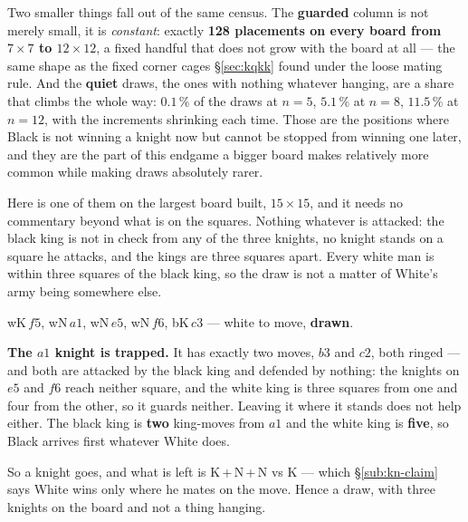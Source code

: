 \documentclass[11pt]{article}
\begin{document}
\smallskip
\noindent
Two smaller things fall out of the same census. The \textbf{guarded} column is
not merely small, it is \emph{constant}: exactly \textbf{128 placements on
every board from $7\times7$ to $12\times12$}, a fixed handful that does not
grow with the board at all --- the same shape as the fixed corner cages \S\ref{sec:kqkk}
found under the loose mating rule. And the \textbf{quiet} draws, the ones with
nothing whatever hanging, are a share that climbs the whole way: $0.1\,\%$ of
the draws at $n=5$, $5.1\,\%$ at $n=8$, $11.5\,\%$ at $n=12$, with the
increments shrinking each time. Those are the positions where Black is not
winning a knight now but cannot be stopped from winning one later, and they are
the part of this endgame a bigger board makes relatively more common while
making draws absolutely rarer.

\noindent
Here is one of them on the largest board built, $15\times15$, and it needs no
commentary beyond what is on the squares. Nothing whatever is attacked: the
black king is not in check from any of the three knights, no knight stands on a
square he attacks, and the kings are three squares apart. Every white man is
within three squares of the black king, so the draw is not a matter of White's
army being somewhere else.

\begin{center}
\begin{minipage}{0.44\textwidth}\centering
{}
\end{minipage}\hfill
\begin{minipage}{0.52\textwidth}
{\small
wK\,$f5$, wN\,$a1$, wN\,$e5$, wN\,$f6$, bK\,$c3$ --- white to move,
\textbf{\color{knnnk}drawn}.

\smallskip
\textbf{The $a1$ knight is trapped.} It has exactly two moves, $b3$ and $c2$,
both ringed --- and both are attacked by the black king and defended by
nothing: the knights on $e5$ and $f6$ reach neither square, and the white king
is three squares from one and four from the other, so it guards neither. Leaving it where it stands does not help either. The
black king is \textbf{two} king-moves from $a1$ and the white king is
\textbf{five}, so Black arrives first whatever White does.

\smallskip
So a knight goes, and what is left is K\,+\,N\,+\,N vs K --- which \S\ref{sub:kn-claim} says
White wins only where he mates on the move. Hence a draw, with three knights on
the board and not a thing hanging.}
\end{minipage}
\end{center}
\end{document}
